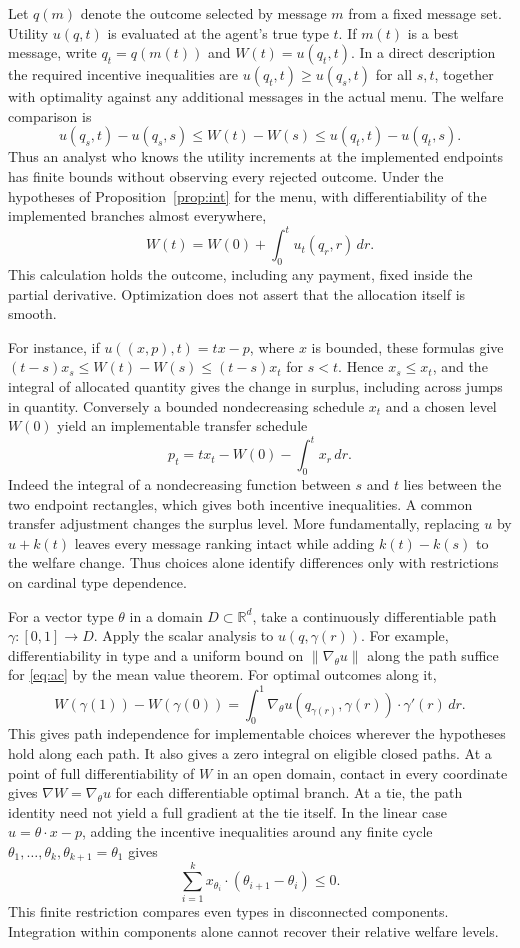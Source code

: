 \documentclass[11pt]{article}
\newcommand{\R}{\mathbb R}
\begin{document}
Let $q(m)$ denote the outcome selected by message $m$ from a fixed message set. Utility $u(q,t)$ is evaluated at the agent's true type $t$. If $m(t)$ is a best message, write $q_t=q(m(t))$ and $W(t)=u(q_t,t)$. In a direct description the required incentive inequalities are $u(q_t,t)\ge u(q_s,t)$ for all $s,t$, together with optimality against any additional messages in the actual menu. The welfare comparison is
\[
 u(q_s,t)-u(q_s,s)\le W(t)-W(s)
 \le u(q_t,t)-u(q_t,s).
\]
Thus an analyst who knows the utility increments at the implemented endpoints has finite bounds without observing every rejected outcome. Under the hypotheses of Proposition~\ref{prop:int} for the menu, with differentiability of the implemented branches almost everywhere,
\[
 W(t)=W(0)+\int_0^t u_t(q_r,r)\,dr .
\]
This calculation holds the outcome, including any payment, fixed inside the partial derivative. Optimization does not assert that the allocation itself is smooth.

For instance, if $u((x,p),t)=tx-p$, where $x$ is bounded, these formulas give $(t-s)x_s\le W(t)-W(s)\le(t-s)x_t$ for $s<t$. Hence $x_s\le x_t$, and the integral of allocated quantity gives the change in surplus, including across jumps in quantity. Conversely a bounded nondecreasing schedule $x_t$ and a chosen level $W(0)$ yield an implementable transfer schedule
\[
 p_t=t x_t-W(0)-\int_0^t x_r\,dr .
\]
Indeed the integral of a nondecreasing function between $s$ and $t$ lies between the two endpoint rectangles, which gives both incentive inequalities. A common transfer adjustment changes the surplus level. More fundamentally, replacing $u$ by $u+k(t)$ leaves every message ranking intact while adding $k(t)-k(s)$ to the welfare change. Thus choices alone identify differences only with restrictions on cardinal type dependence.

For a vector type $\theta$ in a domain $D\subset\R^d$, take a continuously differentiable path $\gamma:[0,1]\to D$. Apply the scalar analysis to $u(q,\gamma(r))$. For example, differentiability in type and a uniform bound on $\|\nabla_\theta u\|$ along the path suffice for \eqref{eq:ac} by the mean value theorem. For optimal outcomes along it,
\[
 W(\gamma(1))-W(\gamma(0))=
 \int_0^1\nabla_\theta u(q_{\gamma(r)},\gamma(r))
                    \cdot\gamma'(r)\,dr .
\]
This gives path independence for implementable choices wherever the hypotheses hold along each path. It also gives a zero integral on eligible closed paths. At a point of full differentiability of $W$ in an open domain, contact in every coordinate gives $\nabla W=\nabla_\theta u$ for each differentiable optimal branch. At a tie, the path identity need not yield a full gradient at the tie itself. In the linear case $u=\theta\cdot x-p$, adding the incentive inequalities around any finite cycle $\theta_1,\ldots,\theta_k,\theta_{k+1}=\theta_1$ gives
\[
 \sum_{i=1}^k x_{\theta_i}\cdot(\theta_{i+1}-\theta_i)\le0 .
\]
This finite restriction compares even types in disconnected components. Integration within components alone cannot recover their relative welfare levels.
\end{document}
